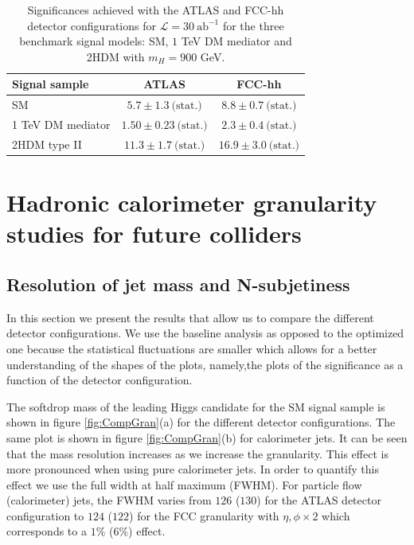 \begin{table}
	\centering
	\caption{Significances achieved with the ATLAS and FCC-hh detector configurations for $\mathcal{L}=30~\text{ab}^{-1}$ for the three benchmark signal models: SM, $1$ TeV DM mediator and 2HDM with $m_H=900$ GeV.}
	\label{table:FCC_ATLAS_comp}
	\begin{tabular}{lcc}
		\toprule 
		\textbf{Signal sample} & ATLAS  & FCC-hh  \\
		\midrule
		SM & $5.7\pm 1.3~\text{(stat.)}$ & $8.8\pm 0.7~\text{(stat.)}$ \\
		\rowcolor{black!7}1 TeV DM mediator & $1.50\pm0.23 ~\text{(stat.)}$ & $2.3\pm0.4 ~\text{(stat.)}$ \\
		2HDM type II & $11.3\pm 1.7 ~\text{(stat.)}$ &  $16.9\pm3.0~\text{(stat.)}$\\ 
		\bottomrule

	\end{tabular}
	
\end{table}


\section{Hadronic calorimeter granularity studies for future colliders}
\label{sec:gran_studies}

\subsection{Resolution of jet mass and N-subjetiness}

In this section we present the results that allow us to compare the different detector configurations. We use the baseline analysis as opposed to the optimized one because the statistical fluctuations are smaller which allows for a better understanding of the shapes of the plots, namely,the plots of the significance as a function of the detector configuration.

The softdrop mass of the leading Higgs candidate for the SM signal sample is shown in figure \ref{fig:CompGran}(a) for the different detector configurations. The same plot is shown in figure \ref{fig:CompGran}(b) for calorimeter jets. It can be seen that the mass resolution increases as we increase the granularity. This effect is more pronounced when using pure calorimeter jets. In order to quantify this effect we use the full width at half maximum (FWHM). For particle flow (calorimeter) jets, the FWHM varies from $126$ ($130$) for the ATLAS detector configuration to $124$ ($122$) for the FCC granularity with $\eta,\phi\times 2$ which corresponds to a $1\%$ ($6\%$) effect.

